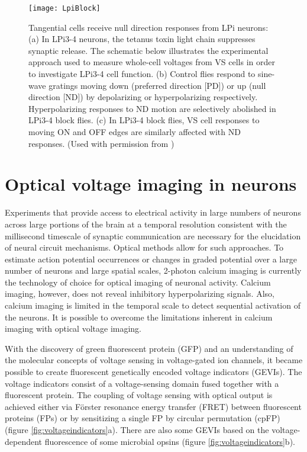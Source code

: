 \begin{figure}
\centering
\hspace*{-1cm} 
\texttt{[image: LpiBlock]}
\caption[Tangential cells receive null direction responses from LPi neurons] {Tangential cells receive null direction responses from LPi neurons: (a) In LPi3-4 neurons, the tetanus toxin light chain suppresses synaptic release. The schematic below illustrates the experimental approach used to measure whole-cell voltages from VS cells in order to investigate LPi3-4 cell function. (b) Control flies respond to sine-wave gratings moving down (preferred direction [PD]) or up (null direction [ND]) by depolarizing or hyperpolarizing respectively. Hyperpolarizing responses to ND motion are selectively abolished in LPi3-4 block flies. (c) In LPi3-4 block flies, VS cell responses to moving ON and OFF edges are similarly affected with ND responses. (Used with permission from \parencite{Mauss2015})} 
\label{fig:lpiblock}
\end{figure}

\section{Optical voltage imaging in neurons}
Experiments that provide access to electrical activity in large numbers of neurons across large portions of the brain at a temporal resolution consistent with the millisecond timescale of synaptic communication are necessary for the elucidation of neural circuit mechanisms. Optical methods allow for such approaches. To estimate action potential occurrences or changes in graded potential over a large number of neurons and large spatial scales, 2-photon calcium imaging is currently the technology of choice for optical imaging of neuronal activity. Calcium imaging, however, does not reveal inhibitory hyperpolarizing signals. Also, calcium imaging is limited in the temporal scale to detect sequential activation of the neurons. It is possible to overcome the limitations inherent in calcium imaging with optical voltage imaging.

With the discovery of green fluorescent protein (GFP) and an understanding of the molecular concepts of voltage sensing in voltage-gated ion channels, it became possible to create fluorescent genetically encoded voltage indicators (GEVIs). The voltage indicators consist of a voltage-sensing domain fused together with a fluorescent protein. The coupling of voltage sensing with optical output is achieved either via Förster resonance energy transfer (FRET) between fluorescent proteins (FPs) or by sensitizing a single FP by circular permutation (cpFP) (figure \ref{fig:voltageindicators}a). There are also some GEVIs based on the voltage-dependent fluorescence of some microbial opsins (figure \ref{fig:voltageindicators}b).

